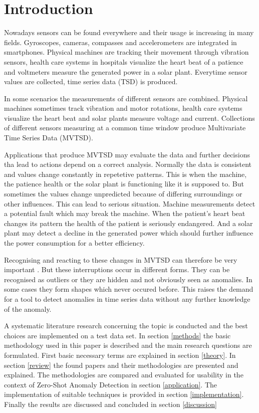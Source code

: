 \section{Introduction}\label{intro}
Nowadays sensors can be found everywhere and their usage is increasing in many fields. Gyroscopes, cameras, compasses and accelerometers are integrated in smartphones. Physical machines are tracking their movement through vibration sensors, health care systems in hospitals visualize the heart beat of a patience and voltmeters measure the generated power in a solar plant. Everytime sensor values are collected, time series data (TSD) is produced.

In some scenarios the measurements of different sensors are combined. Physical machines sometimes track vibration and motor rotations, health care systems visualize the heart beat and solar plants measure voltage and current.
Collections of different sensors measuring at a common time window produce Multivariate Time Series Data (MVTSD).

Applications that produce MVTSD may evaluate the data and further decisions tha lead to actions depend on a correct analysis.
Normally the data is consistent and values change constantly in repetetive patterns. This is when the machine, the patience health or the solar plant is functioning like it is supposed to. But sometimes the values change unpredicted because of differing surroundings or other influences. This can lead to serious situation. Machine measurements detect a potential fault which may break the machine. When the patient's heart beat changes its pattern the health of the patient is seriously endangered. And a solar plant may detect a decline in the generated power which should further influence the power consumption for a better efficiency.

Recognising and reacting to these changes in MVTSD can therefore be very important%
. But these interruptions occur in different forms. They can be recognised as outliers or they are hidden and not obviously seen as anomalies. In some cases they form shapes which never occured before. This raises the demand for a tool to detect anomalies in time series data without any further knowledge of the anomaly.


A systematic literature research concerning the topic is conducted and the best choices are implemented on a test data set. In section \ref{methods} the basic methodology used in this paper is described and the main research questions are formulated. First basic necessary terms are explained in section \ref{theory}. In section \ref{review} the found papers and their methodologies are presented and explained. The methodologies are compared and evaluated for usability in the context of Zero-Shot Anomaly Detection in section \ref{application}. The implementation of suitable techniques is provided in section \ref{implementation}. Finally the results are discussed and concluded in section \ref{discussion}
